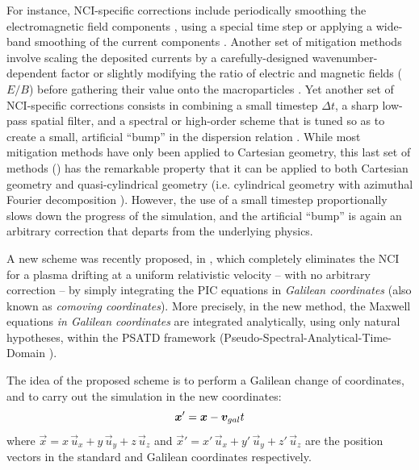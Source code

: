 For instance, NCI-specific corrections include periodically smoothing
the electromagnetic field components \cite{Martinscpc10},
using a special time step \cite{VayAAC2010,Vayjcp2011} or
applying a wide-band smoothing of the current components \cite{VayAAC2010,Vayjcp2011,VayPOPL2011}. Another set of mitigation methods
involve scaling the deposited
currents by a carefully-designed wavenumber-dependent factor
\cite{GodfreyJCP2014_FDTD,GodfreyIEEE2014} or slightly modifying the
ratio of electric and magnetic fields ($E/B$) before gathering their
value onto the macroparticles
\cite{GodfreyJCP2014_PSATD,GodfreyCPC2015}.
Yet another set of NCI-specific corrections
\cite{YuCPC2015,YuCPC2015-Circ} consists
in combining a small timestep $\Delta t$, a sharp low-pass spatial filter,
and a spectral or high-order scheme that is tuned so as to
create a small, artificial ``bump'' in the dispersion relation
\cite{YuCPC2015}. While most mitigation methods have only been applied
to Cartesian geometry, this last
set of methods (\cite{YuCPC2015,YuCPC2015-Circ})
has the remarkable property that it can be applied
\cite{YuCPC2015-Circ} to both Cartesian geometry and
quasi-cylindrical geometry (i.e. cylindrical geometry with
azimuthal Fourier decomposition \cite{LifschitzJCP2009,DavidsonJCP2015,Lehe2016}). However,
the use of a small timestep proportionally slows down the progress of
the simulation, and the artificial ``bump'' is again an arbitrary correction
that departs from the underlying physics.

A new scheme was recently proposed, in \cite{KirchenARXIV2016,LeheARXIV2016}, which
completely eliminates the NCI for a plasma drifting at a uniform relativistic velocity
-- with no arbitrary correction -- by simply integrating
the PIC equations in \emph{Galilean coordinates} (also known as
\emph{comoving coordinates}). More precisely, in the new
method, the Maxwell equations \emph{in Galilean coordinates} are integrated
analytically, using only natural hypotheses, within the PSATD
framework (Pseudo-Spectral-Analytical-Time-Domain \cite{Habericnsp73,VayJCP2013}).

The idea of the proposed scheme is to perform a Galilean change of
coordinates, and to carry out the simulation in the new coordinates:
\begin{equation}
\label{eq:change-var}
\boldsymbol{x}' = \boldsymbol{x} - \boldsymbol{v}_{gal} t
\end{equation}
where $\vec{x} = x\,\vec{u}_x + y\,\vec{u}_y + z\,\vec{u}_z$ and
$\vec{x}' = x'\,\vec{u}_x + y'\,\vec{u}_y + z'\,\vec{u}_z$ are the
position vectors in the standard and Galilean coordinates
respectively.

